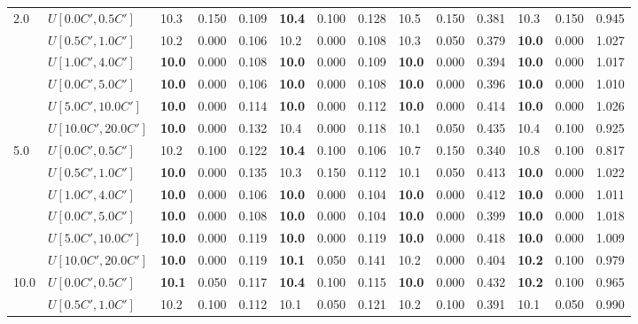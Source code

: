 \begin{table}[h]
{\begin{tabular}{|l|l||l|l|l||l|l|l||l|l|l||l|l|l|}
      \hline\hline
      \multirow{6}{*}{2.0} & $U[0.0C',0.5C']$ & 10.3 & 0.150 & 0.109 & \textbf{10.4} & 0.100 & 0.128 & 10.5 & 0.150 & 0.381 & 10.3 & 0.150 & 0.945 \\
       & $U[0.5C',1.0C']$ & 10.2 & 0.000 & 0.106 & 10.2 & 0.000 & 0.108 & 10.3 & 0.050 & 0.379 & \textbf{10.0} & 0.000 & 1.027 \\
       & $U[1.0C',4.0C']$ & \textbf{10.0} & 0.000 & 0.108 & \textbf{10.0} & 0.000 & 0.109 & \textbf{10.0} & 0.000 & 0.394 & \textbf{10.0} & 0.000 & 1.017 \\
       & $U[0.0C',5.0C']$ & \textbf{10.0} & 0.000 & 0.106 & \textbf{10.0} & 0.000 & 0.108 & \textbf{10.0} & 0.000 & 0.396 & \textbf{10.0} & 0.000 & 1.010 \\
       & $U[5.0C',10.0C']$ & \textbf{10.0} & 0.000 & 0.114 & \textbf{10.0} & 0.000 & 0.112 & \textbf{10.0} & 0.000 & 0.414 & \textbf{10.0} & 0.000 & 1.026 \\
       & $U[10.0C',20.0C']$ & \textbf{10.0} & 0.000 & 0.132 & 10.4 & 0.000 & 0.118 & 10.1 & 0.050 & 0.435 & 10.4 & 0.100 & 0.925 \\
      \hline\hline
      \multirow{6}{*}{5.0} & $U[0.0C',0.5C']$ & 10.2 & 0.100 & 0.122 & \textbf{10.4} & 0.100 & 0.106 & 10.7 & 0.150 & 0.340 & 10.8 & 0.100 & 0.817 \\
       & $U[0.5C',1.0C']$ & \textbf{10.0} & 0.000 & 0.135 & 10.3 & 0.150 & 0.112 & 10.1 & 0.050 & 0.413 & \textbf{10.0} & 0.000 & 1.022 \\
       & $U[1.0C',4.0C']$ & \textbf{10.0} & 0.000 & 0.106 & \textbf{10.0} & 0.000 & 0.104 & \textbf{10.0} & 0.000 & 0.412 & \textbf{10.0} & 0.000 & 1.011 \\
       & $U[0.0C',5.0C']$ & \textbf{10.0} & 0.000 & 0.108 & \textbf{10.0} & 0.000 & 0.104 & \textbf{10.0} & 0.000 & 0.399 & \textbf{10.0} & 0.000 & 1.018 \\
       & $U[5.0C',10.0C']$ & \textbf{10.0} & 0.000 & 0.119 & \textbf{10.0} & 0.000 & 0.119 & \textbf{10.0} & 0.000 & 0.418 & \textbf{10.0} & 0.000 & 1.009 \\
       & $U[10.0C',20.0C']$ & \textbf{10.0} & 0.000 & 0.119 & \textbf{10.1} & 0.050 & 0.141 & 10.2 & 0.000 & 0.404 & \textbf{10.2} & 0.100 & 0.979 \\
      \hline\hline
      \multirow{6}{*}{10.0} & $U[0.0C',0.5C']$ & \textbf{10.1} & 0.050 & 0.117 & \textbf{10.4} & 0.100 & 0.115 & \textbf{10.0} & 0.000 & 0.432 & \textbf{10.2} & 0.100 & 0.965 \\
       & $U[0.5C',1.0C']$ & 10.2 & 0.100 & 0.112 & 10.1 & 0.050 & 0.121 & 10.2 & 0.100 & 0.391 & 10.1 & 0.050 & 0.990 \\

\end{tabular}}
\end{table}
